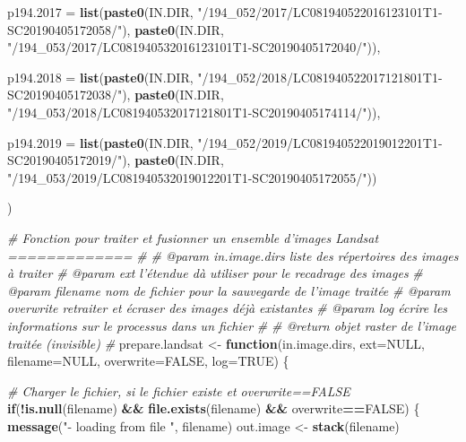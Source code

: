 \documentclass[a4paper, notitlepage, 12pt, krantz2]{krantz}
\newenvironment{Shaded}{\begin{snugshade}}{\end{snugshade}}
\newcommand{\CommentTok}[1]{\textcolor[rgb]{0.56,0.35,0.01}{\textit{#1}}}
\newcommand{\ControlFlowTok}[1]{\textcolor[rgb]{0.13,0.29,0.53}{\textbf{#1}}}
\newcommand{\DataTypeTok}[1]{\textcolor[rgb]{0.13,0.29,0.53}{#1}}
\newcommand{\KeywordTok}[1]{\textcolor[rgb]{0.13,0.29,0.53}{\textbf{#1}}}
\newcommand{\NormalTok}[1]{#1}
\newcommand{\OperatorTok}[1]{\textcolor[rgb]{0.81,0.36,0.00}{\textbf{#1}}}
\newcommand{\OtherTok}[1]{\textcolor[rgb]{0.56,0.35,0.01}{#1}}
\newcommand{\StringTok}[1]{\textcolor[rgb]{0.31,0.60,0.02}{#1}}
\begin{document}
\begin{Shaded}
\begin{Highlighting}[]
  \DataTypeTok{p194.2017 =} \KeywordTok{list}\NormalTok{(}\KeywordTok{paste0}\NormalTok{(IN.DIR, }\StringTok{"/194_052/2017/LC081940522016123101T1-SC20190405172058/"}\NormalTok{),}
                   \KeywordTok{paste0}\NormalTok{(IN.DIR, }\StringTok{"/194_053/2017/LC081940532016123101T1-SC20190405172040/"}\NormalTok{)),}

  \DataTypeTok{p194.2018 =} \KeywordTok{list}\NormalTok{(}\KeywordTok{paste0}\NormalTok{(IN.DIR, }\StringTok{"/194_052/2018/LC081940522017121801T1-SC20190405172038/"}\NormalTok{),}
                   \KeywordTok{paste0}\NormalTok{(IN.DIR, }\StringTok{"/194_053/2018/LC081940532017121801T1-SC20190405174114/"}\NormalTok{)),}

  \DataTypeTok{p194.2019 =} \KeywordTok{list}\NormalTok{(}\KeywordTok{paste0}\NormalTok{(IN.DIR, }\StringTok{"/194_052/2019/LC081940522019012201T1-SC20190405172019/"}\NormalTok{),}
                   \KeywordTok{paste0}\NormalTok{(IN.DIR, }\StringTok{"/194_053/2019/LC081940532019012201T1-SC20190405172055/"}\NormalTok{))}

\NormalTok{)}

\CommentTok{# Fonction pour traiter et fusionner un ensemble d'images Landsat =============}
\CommentTok{#}
\CommentTok{# @param in.image.dirs liste des répertoires des images à traiter}
\CommentTok{# @param ext           l'étendue dà utiliser pour le recadrage des images}
\CommentTok{# @param filename      nom de fichier pour la sauvegarde de l'image traitée}
\CommentTok{# @param overwrite     retraiter et écraser des images déjà existantes}
\CommentTok{# @param log           écrire les informations sur le processus dans un fichier}
\CommentTok{#}
\CommentTok{# @return              objet raster de l'image traitée (invisible)}
\CommentTok{#}
\NormalTok{prepare.landsat <-}\StringTok{ }\ControlFlowTok{function}\NormalTok{(in.image.dirs, }
                            \DataTypeTok{ext=}\OtherTok{NULL}\NormalTok{, }
                            \DataTypeTok{filename=}\OtherTok{NULL}\NormalTok{, }
                            \DataTypeTok{overwrite=}\OtherTok{FALSE}\NormalTok{, }
                            \DataTypeTok{log=}\OtherTok{TRUE}\NormalTok{) \{}
  
  \CommentTok{# Charger le fichier, si le fichier existe et overwrite==FALSE}
  \ControlFlowTok{if}\NormalTok{(}\OperatorTok{!}\KeywordTok{is.null}\NormalTok{(filename) }\OperatorTok{&&}\StringTok{ }\KeywordTok{file.exists}\NormalTok{(filename) }\OperatorTok{&&}\StringTok{ }\NormalTok{overwrite}\OperatorTok{==}\OtherTok{FALSE}\NormalTok{) \{}
    \KeywordTok{message}\NormalTok{(}\StringTok{"- loading from file "}\NormalTok{, filename)}
\NormalTok{    out.image <-}\StringTok{ }\KeywordTok{stack}\NormalTok{(filename)}
    

\end{Highlighting}
\end{Shaded}
\end{document}
